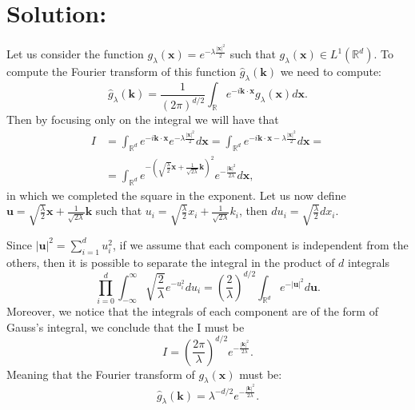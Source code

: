 \documentclass{article}
\begin{document}
\section{Solution:}
Let us consider the function $g_\lambda (\mathbf{x}) = e^{-\lambda \frac{|\mathbf{x}|^2}{2}}$ such that $g_\lambda (\mathbf{x}) \in L^1(\mathbb{R}^d)$. To compute the Fourier transform of this function $\hat{g}_\lambda (\mathbf{k})$ we need to compute:
\[
    \hat{g}_\lambda (\mathbf{k}) = \frac{1}{(2 \pi)^{d/2}} \int_\mathbb{R}{ e^{-i\mathbf{k \cdot x}} g_\lambda (\mathbf{x})d\mathbf{x}}.
\]
Then by focusing only on the integral we will have that
\[
    \begin{split}
        I &= \int_{\mathbb R^d} e^{-i \mathbf{k \cdot x}} e^{-\lambda \frac{|\mathbf{x}|^2}{2}} d\mathbf{x} = \int_{\mathbb R^d} e^{-i \mathbf{k \cdot x} - \lambda \frac{|\mathbf{x}|^2}{2}} d\mathbf{x} =\\
	   &= \int_{\mathbb R^d} e^{-(\sqrt{\frac{\lambda}{2}} \mathbf{x} + \frac{1}{\sqrt{2\lambda}}\mathbf{k})^2} e^{-\frac{|\mathbf{k}|^2}{2\lambda}} d\mathbf{x},
    \end{split}
\]
in which we completed the square in the exponent. Let us now define $\mathbf{u} = \sqrt{\frac{\lambda}{2}} \mathbf{x} + \frac{1}{\sqrt{2\lambda}}\mathbf{k}$ such that $u_i = \sqrt{\frac{\lambda}{2}} x_i + \frac{1}{\sqrt{2\lambda}}k_i$, then $du_i = \sqrt{\frac{\lambda}{2}} dx_i$.

Since $|\mathbf{u}|^2 = \sum^d_{i=1} u_i^2$, if we assume that each component is independent from the others, then it is possible to separate the integral in the product of $d$ integrals
\[
    \prod^d_{i=0} \int_{-\infty}^{\infty} \sqrt{\frac{2}{\lambda}} e^{-u_i^2}du_i = \left( \frac{2}{\lambda} \right)^{d/2} \int_{\mathbb R^d} e^{-|\mathbf{u}|^2} d\mathbf{u}.
\]
Moreover, we notice that the integrals of each component are of the form of Gauss's integral, we conclude that the I must be
\[
    I = \left( \frac{2 \pi}{\lambda} \right)^{d/2} e^{-\frac{|\mathbf{k}|^2}{2\lambda}}.
\]
Meaning that the Fourier transform of $g_\lambda (\mathbf{x})$ must be:
\[
    \hat{g}_\lambda (\mathbf{k}) = \lambda^{-d/2} e^{-\frac{|\mathbf{k}|^2}{2\lambda}}.
\]
\end{document}
